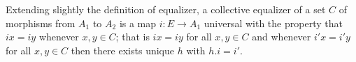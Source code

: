 Extending slightly the definition of equalizer, a collective equalizer of a set $C$ of morphisms from $A_1$ to $A_2$ is a map $i: E \longrightarrow A_1$ universal with the property that $ix = iy$ whenever $x, y \in C$; that is $ix = iy$ for all $x, y \in C$ and whenever $i'x = i'y$ for all $x, y \in C$ then there exists unique $h$ with $h.i = i'$.
